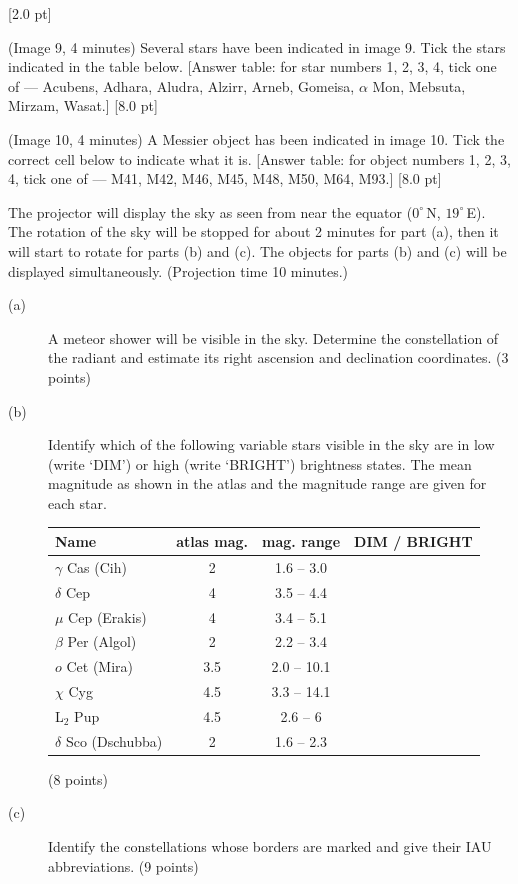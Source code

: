 \begin{description}
  \hfill[2.0 pt]
\item[(1.16)] (Image 9, 4 minutes) Several stars have been indicated in
  image 9. Tick the stars indicated in the table below.
  [Answer table: for star numbers 1, 2, 3, 4, tick one of --- Acubens,
  Adhara, Aludra, Alzirr, Arneb, Gomeisa, $\alpha$ Mon, Mebsuta, Mirzam,
  Wasat.] \hfill[8.0 pt]
\item[(1.17)] (Image 10, 4 minutes) A Messier object has been indicated in
  image 10. Tick the correct cell below to indicate what it is.
  [Answer table: for object numbers 1, 2, 3, 4, tick one of --- M41, M42,
  M46, M45, M48, M50, M64, M93.] \hfill[8.0 pt]
\end{description}

The projector will display the sky as seen from near the equator
($0^\circ$\,N, $19^\circ$\,E). The rotation of the sky will be stopped for
about 2 minutes for part (a), then it will start to rotate for parts (b) and
(c). The objects for parts (b) and (c) will be displayed simultaneously.
(Projection time 10 minutes.)

\begin{description}
\item[(a)] A meteor shower will be visible in the sky. Determine the
  constellation of the radiant and estimate its right ascension and
  declination coordinates. \hfill(3 points)
\item[(b)] Identify which of the following variable stars visible in the sky
  are in low (write `DIM') or high (write `BRIGHT') brightness states. The
  mean magnitude as shown in the atlas and the magnitude range are given for
  each star.

  \begin{center}
  \begin{tabular}{lccc}
  Name & atlas mag. & mag. range & DIM / BRIGHT \\
  \hline
  $\gamma$ Cas (Cih) & 2 & 1.6 -- 3.0 & \\
  $\delta$ Cep & 4 & 3.5 -- 4.4 & \\
  $\mu$ Cep (Erakis) & 4 & 3.4 -- 5.1 & \\
  $\beta$ Per (Algol) & 2 & 2.2 -- 3.4 & \\
  $o$ Cet (Mira) & 3.5 & 2.0 -- 10.1 & \\
  $\chi$ Cyg & 4.5 & 3.3 -- 14.1 & \\
  L$_2$ Pup & 4.5 & 2.6 -- 6 & \\
  $\delta$ Sco (Dschubba) & 2 & 1.6 -- 2.3 & \\
  \end{tabular}
  \end{center}
  \hfill(8 points)
\item[(c)] Identify the constellations whose borders are marked and give
  their IAU abbreviations. \hfill(9 points)
\end{description}

